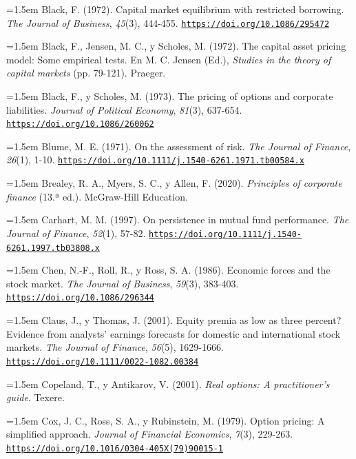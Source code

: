 \documentclass[10pt,a4paper]{article}
\begin{document}
\noindent\hangindent=1.5em Black, F. (1972). Capital market equilibrium with restricted borrowing. \textit{The Journal of Business}, \textit{45}(3), 444-455. \href{https://doi.org/10.1086/295472}{\nolinkurl{https://doi.org/10.1086/295472}}

\noindent\hangindent=1.5em Black, F., Jensen, M. C., y Scholes, M. (1972). The capital asset pricing model: Some empirical tests. En M. C. Jensen (Ed.), \textit{Studies in the theory of capital markets} (pp. 79-121). Praeger.

\noindent\hangindent=1.5em Black, F., y Scholes, M. (1973). The pricing of options and corporate liabilities. \textit{Journal of Political Economy}, \textit{81}(3), 637-654. \href{https://doi.org/10.1086/260062}{\nolinkurl{https://doi.org/10.1086/260062}}

\noindent\hangindent=1.5em Blume, M. E. (1971). On the assessment of risk. \textit{The Journal of Finance}, \textit{26}(1), 1-10. \href{https://doi.org/10.1111/j.1540-6261.1971.tb00584.x}{\nolinkurl{https://doi.org/10.1111/j.1540-6261.1971.tb00584.x}}

\noindent\hangindent=1.5em Brealey, R. A., Myers, S. C., y Allen, F. (2020). \textit{Principles of corporate finance} (13.ª ed.). McGraw-Hill Education.

\noindent\hangindent=1.5em Carhart, M. M. (1997). On persistence in mutual fund performance. \textit{The Journal of Finance}, \textit{52}(1), 57-82. \href{https://doi.org/10.1111/j.1540-6261.1997.tb03808.x}{\nolinkurl{https://doi.org/10.1111/j.1540-6261.1997.tb03808.x}}

\noindent\hangindent=1.5em Chen, N.-F., Roll, R., y Ross, S. A. (1986). Economic forces and the stock market. \textit{The Journal of Business}, \textit{59}(3), 383-403. \href{https://doi.org/10.1086/296344}{\nolinkurl{https://doi.org/10.1086/296344}}

\noindent\hangindent=1.5em Claus, J., y Thomas, J. (2001). Equity premia as low as three percent? Evidence from analysts' earnings forecasts for domestic and international stock markets. \textit{The Journal of Finance}, \textit{56}(5), 1629-1666. \href{https://doi.org/10.1111/0022-1082.00384}{\nolinkurl{https://doi.org/10.1111/0022-1082.00384}}

\noindent\hangindent=1.5em Copeland, T., y Antikarov, V. (2001). \textit{Real options: A practitioner's guide}. Texere.

\noindent\hangindent=1.5em Cox, J. C., Ross, S. A., y Rubinstein, M. (1979). Option pricing: A simplified approach. \textit{Journal of Financial Economics}, \textit{7}(3), 229-263. \href{https://doi.org/10.1016/0304-405X(79)90015-1}{\nolinkurl{https://doi.org/10.1016/0304-405X(79)90015-1}}
\end{document}
